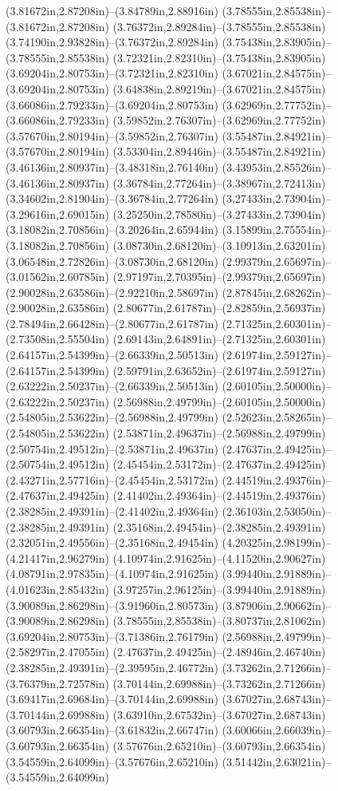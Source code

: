 (3.81672in,2.87208in)--(3.84789in,2.88916in) (3.78555in,2.85538in)--(3.81672in,2.87208in) (3.76372in,2.89284in)--(3.78555in,2.85538in) (3.74190in,2.93828in)--(3.76372in,2.89284in) (3.75438in,2.83905in)--(3.78555in,2.85538in) (3.72321in,2.82310in)--(3.75438in,2.83905in) (3.69204in,2.80753in)--(3.72321in,2.82310in) (3.67021in,2.84575in)--(3.69204in,2.80753in) (3.64838in,2.89219in)--(3.67021in,2.84575in) (3.66086in,2.79233in)--(3.69204in,2.80753in) (3.62969in,2.77752in)--(3.66086in,2.79233in) (3.59852in,2.76307in)--(3.62969in,2.77752in) (3.57670in,2.80194in)--(3.59852in,2.76307in) (3.55487in,2.84921in)--(3.57670in,2.80194in) (3.53304in,2.89446in)--(3.55487in,2.84921in) (3.46136in,2.80937in)--(3.48318in,2.76140in) (3.43953in,2.85526in)--(3.46136in,2.80937in) (3.36784in,2.77264in)--(3.38967in,2.72413in) (3.34602in,2.81904in)--(3.36784in,2.77264in) (3.27433in,2.73904in)--(3.29616in,2.69015in) (3.25250in,2.78580in)--(3.27433in,2.73904in) (3.18082in,2.70856in)--(3.20264in,2.65944in) (3.15899in,2.75554in)--(3.18082in,2.70856in) (3.08730in,2.68120in)--(3.10913in,2.63201in) (3.06548in,2.72826in)--(3.08730in,2.68120in) (2.99379in,2.65697in)--(3.01562in,2.60785in) (2.97197in,2.70395in)--(2.99379in,2.65697in) (2.90028in,2.63586in)--(2.92210in,2.58697in) (2.87845in,2.68262in)--(2.90028in,2.63586in) (2.80677in,2.61787in)--(2.82859in,2.56937in) (2.78494in,2.66428in)--(2.80677in,2.61787in) (2.71325in,2.60301in)--(2.73508in,2.55504in) (2.69143in,2.64891in)--(2.71325in,2.60301in) (2.64157in,2.54399in)--(2.66339in,2.50513in) (2.61974in,2.59127in)--(2.64157in,2.54399in) (2.59791in,2.63652in)--(2.61974in,2.59127in) (2.63222in,2.50237in)--(2.66339in,2.50513in) (2.60105in,2.50000in)--(2.63222in,2.50237in) (2.56988in,2.49799in)--(2.60105in,2.50000in) (2.54805in,2.53622in)--(2.56988in,2.49799in) (2.52623in,2.58265in)--(2.54805in,2.53622in) (2.53871in,2.49637in)--(2.56988in,2.49799in) (2.50754in,2.49512in)--(2.53871in,2.49637in) (2.47637in,2.49425in)--(2.50754in,2.49512in) (2.45454in,2.53172in)--(2.47637in,2.49425in) (2.43271in,2.57716in)--(2.45454in,2.53172in) (2.44519in,2.49376in)--(2.47637in,2.49425in) (2.41402in,2.49364in)--(2.44519in,2.49376in) (2.38285in,2.49391in)--(2.41402in,2.49364in) (2.36103in,2.53050in)--(2.38285in,2.49391in) (2.35168in,2.49454in)--(2.38285in,2.49391in) (2.32051in,2.49556in)--(2.35168in,2.49454in) (4.20325in,2.98199in)--(4.21417in,2.96279in) (4.10974in,2.91625in)--(4.11520in,2.90627in) (4.08791in,2.97835in)--(4.10974in,2.91625in) (3.99440in,2.91889in)--(4.01623in,2.85432in) (3.97257in,2.96125in)--(3.99440in,2.91889in) (3.90089in,2.86298in)--(3.91960in,2.80573in) (3.87906in,2.90662in)--(3.90089in,2.86298in) (3.78555in,2.85538in)--(3.80737in,2.81062in) (3.69204in,2.80753in)--(3.71386in,2.76179in) (2.56988in,2.49799in)--(2.58297in,2.47055in) (2.47637in,2.49425in)--(2.48946in,2.46740in) (2.38285in,2.49391in)--(2.39595in,2.46772in) (3.73262in,2.71266in)--(3.76379in,2.72578in) (3.70144in,2.69988in)--(3.73262in,2.71266in) (3.69417in,2.69684in)--(3.70144in,2.69988in) (3.67027in,2.68743in)--(3.70144in,2.69988in) (3.63910in,2.67532in)--(3.67027in,2.68743in) (3.60793in,2.66354in)--(3.61832in,2.66747in) (3.60066in,2.66039in)--(3.60793in,2.66354in) (3.57676in,2.65210in)--(3.60793in,2.66354in) (3.54559in,2.64099in)--(3.57676in,2.65210in) (3.51442in,2.63021in)--(3.54559in,2.64099in) 